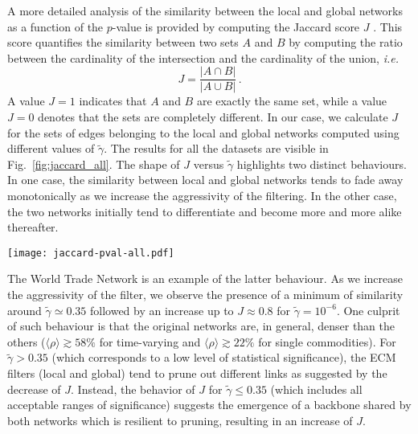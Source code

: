 \documentclass[aps,twocolumn,superscriptaddress]{revtex4-1}
\newcommand{\ie}{\emph{i.e.} }
\begin{document}
A more detailed analysis of the similarity between the local and global networks as a function of the $p$-value is provided by computing the Jaccard score $J$ \cite{jaccard_score-1902}. This score quantifies the similarity between two sets $A$ and $B$ by computing the ratio between the cardinality of the intersection and the cardinality of the union, \ie
%
\begin{equation}
\label{eq:jaccard}
%
J = \dfrac{\lvert A \cap B \rvert}{\lvert A \cup B \rvert} \,.
%
\end{equation}
%
A value $J=1$ indicates that $A$ and $B$ are exactly the same set, while a value $J=0$ denotes that the sets are completely different. In our case, we calculate $J$ for the sets of edges belonging to the local and global networks computed using different values of $\widetilde{\gamma}$. The results for all the datasets are visible in Fig.~\ref{fig:jaccard_all}. The shape of $J$ versus $\widetilde{\gamma}$ highlights two distinct behaviours. 
In one case, the similarity between local and global networks tends to fade away monotonically as we increase the aggressivity of the filtering. 
In the other case, the two networks initially tend to differentiate and become more and more alike thereafter. 
%
%
\begin{figure*}[t]
%
\texttt{[image: jaccard-pval-all.pdf]}
%
\caption{Jaccard score $J$ of local and global filtered backbones obtained at different $p$-values $\widetilde{\gamma}$ for all the datasets considered in our study. The vertical dashed line denotes $\widetilde{\gamma} = 0.05$.}
\label{fig:jaccard_all}
\end{figure*}
%
The World Trade Network is an example of the latter behaviour. As we increase the aggressivity of the filter, we observe the presence of a minimum of similarity around $\widetilde{\gamma} \simeq 0.35$ followed by an increase up to $J \approx 0.8$ for $\widetilde{\gamma} = 10^{-6}$. One culprit of such behaviour is that the original networks are, in general, denser than the others ($\langle \rho \rangle \gtrsim 58\%$ for time-varying and $\langle \rho \rangle \gtrsim 22\%$ for single commodities). For $\widetilde{\gamma} > 0.35$ (which corresponds to a low level of statistical significance), the ECM filters (local and global) tend to prune out different links as suggested by the decrease of $J$. Instead, the behavior of $J$ for $\widetilde{\gamma} \leq 0.35$ (which includes all acceptable ranges of significance) suggests the emergence of a backbone shared by both networks which is resilient to pruning, resulting in an increase of $J$.
\end{document}
